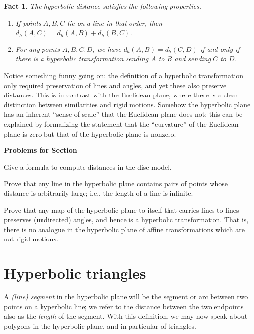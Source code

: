 \documentclass[12pt]{book}
\newcounter{exc}
\numberwithin{exc}{section}
\numberwithin{figure}{section}
\newenvironment{exer}{\vspace{0.1in}
\noindent \textbf{Problems for Section~\thesection} \vspace{0.1in}
\begin{list}{\arabic{exc}.}{\usecounter{exc}}}{\end{list}}
\newtheorem{fact}[theorem]{Fact}
\numberwithin{equation}{theorem}
\begin{document}
\begin{fact}
The hyperbolic distance satisfies the following properties.
\begin{enumerate}
\item[(a)]
If points $A,B,C$ lie on a line in that order,
then $d_h(A,C) = d_h(A,B) + d_h(B,C)$. 
\item[(b)]
For any points $A,B,C,D$, we have $d_h(A,B)=d_h(C,D)$ if and only if there is
a hyperbolic transformation sending $A$ to $B$ and sending $C$ to $D$.
\end{enumerate}
\end{fact}
Notice something funny going on: the definition of a hyperbolic transformation
only required preservation of lines and angles, and yet these also preserve
distances. This is in contrast with the Euclidean plane, where there is
a clear distinction between similarities and rigid motions. Somehow the
hyperbolic plane has an inherent ``sense of scale'' that the Euclidean
plane does not; this can be explained by formalizing the statement that
the ``curvature'' of the Euclidean plane is zero but that of the
hyperbolic plane is nonzero.

\begin{exer}
\item
Give a formula to compute distances in the disc model.
\item
Prove that any line in the hyperbolic plane contains pairs of points
whose distance is arbitrarily large; i.e., the length of a line is infinite.
\item
Prove that any map of the hyperbolic plane to itself that carries lines to
lines preserves (undirected) angles, and hence is a hyperbolic transformation.
That is, there is no analogue in the hyperbolic plane of affine transformations
which are not rigid motions.
\end{exer}

\section{Hyperbolic triangles}

A \emph{(line) segment} in the hyperbolic plane will be the segment
or arc between two points on a hyperbolic line; we refer to the distance
between the two endpoints also as the \emph{length} of the segment.
With this definition, we may now speak about polygons in the hyperbolic
plane, and in particular of triangles.
\end{document}

